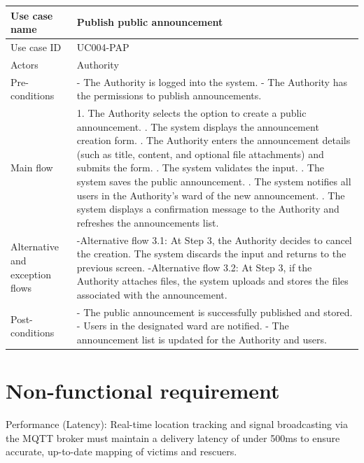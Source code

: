 \documentclass[../Main.tex]{subfiles}
\begin{document}
\begin{xltabular}{\textwidth}{|p{3.5cm}|X|}
    Use case name & Publish public announcement \\
    \hline
    Use case ID & UC004-PAP \\
    \hline
    Actors & Authority \\
    \hline
    Pre-conditions &
    - The Authority is logged into the system. \newline
    - The Authority has the permissions to publish announcements. \\
    \hline
    Main flow &
    1. The Authority selects the option to create a public announcement. . The system displays the announcement creation form. . The Authority enters the announcement details (such as title, content, and optional file attachments) and submits the form. . The system validates the input. . The system saves the public announcement. . The system notifies all users in the Authority's ward of the new announcement. . The system displays a confirmation message to the Authority and refreshes the announcements list. \\
    \hline
    Alternative and exception flows &
    -Alternative flow 3.1: At Step 3, the Authority decides to cancel the creation. The system discards the input and returns to the previous screen. \newline
    -Alternative flow 3.2: At Step 3, if the Authority attaches files, the system uploads and stores the files associated with the announcement. \\
    \hline
    Post-conditions &
    - The public announcement is successfully published and stored. \newline
    - Users in the designated ward are notified. \newline
    - The announcement list is updated for the Authority and users. \\
    \hline
\end{xltabular}

\section{Non-functional requirement}
\label{section:2.4}
Performance (Latency): Real-time location tracking and signal broadcasting via the MQTT broker must maintain a delivery latency of under 500ms to ensure accurate, up-to-date mapping of victims and rescuers.
\end{document}
